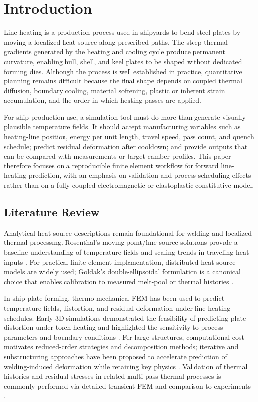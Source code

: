 \section{Introduction}
\label{sec:intro}

Line heating is a production process used in shipyards to bend steel plates by moving a localized heat source along prescribed paths. The steep thermal gradients generated by the heating and cooling cycle produce permanent curvature, enabling hull, shell, and keel plates to be shaped without dedicated forming dies. Although the process is well established in practice, quantitative planning remains difficult because the final shape depends on coupled thermal diffusion, boundary cooling, material softening, plastic or inherent strain accumulation, and the order in which heating passes are applied.

For ship-production use, a simulation tool must do more than generate visually plausible temperature fields. It should accept manufacturing variables such as heating-line position, energy per unit length, travel speed, pass count, and quench schedule; predict residual deformation after cooldown; and provide outputs that can be compared with measurements or target camber profiles. This paper therefore focuses on a reproducible finite element workflow for forward line-heating prediction, with an emphasis on validation and process-scheduling effects rather than on a fully coupled electromagnetic or elastoplastic constitutive model.

\subsection{Literature Review}
Analytical heat-source descriptions remain foundational for welding and localized thermal processing. Rosenthal's moving point/line source solutions provide a baseline understanding of temperature fields and scaling trends in traveling heat inputs \cite{rosenthal1941}. For practical finite element implementation, distributed heat-source models are widely used; Goldak's double-ellipsoidal formulation is a canonical choice that enables calibration to measured melt-pool or thermal histories \cite{goldak1984}.

In ship plate forming, thermo-mechanical FEM has been used to predict temperature fields, distortion, and residual deformation under line-heating schedules. Early 3D simulations demonstrated the feasibility of predicting plate distortion under torch heating and highlighted the sensitivity to process parameters and boundary conditions \cite{biswas2007}. For large structures, computational cost motivates reduced-order strategies and decomposition methods; iterative and substructuring approaches have been proposed to accelerate prediction of welding-induced deformation while retaining key physics \cite{murakawa2015}. Validation of thermal histories and residual stresses in related multi-pass thermal processes is commonly performed via detailed transient FEM and comparison to experiments \cite{deng2012}.

